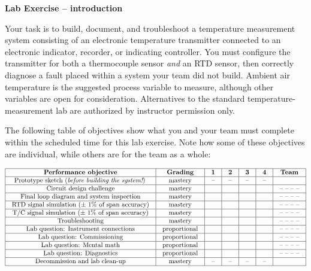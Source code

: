 

\noindent
{\bf Lab Exercise -- introduction}

\vskip 5pt

Your task is to build, document, and troubleshoot a temperature measurement system consisting of an electronic temperature transmitter connected to an electronic indicator, recorder, or indicating controller.  You must configure the transmitter for both a thermocouple sensor {\it and} an RTD sensor, then correctly diagnose a fault placed within a system your team did not build.  Ambient air temperature is the suggested process variable to measure, although other variables are open for consideration.  Alternatives to the standard temperature-measurement lab are authorized by instructor permission only.

The following table of objectives show what you and your team must complete within the scheduled time for this lab exercise.  Note how some of these objectives are individual, while others are for the team as a whole:



$$\vbox{\offinterlineskip
\halign{\strut
\vrule \quad\hfil # \ \hfil & 
\vrule \quad\hfil # \ \hfil & 
\vrule \quad\hfil # \ \hfil & 
\vrule \quad\hfil # \ \hfil & 
\vrule \quad\hfil # \ \hfil & 
\vrule \quad\hfil # \ \hfil & 
\vrule \quad\hfil # \ \hfil \vrule \cr
\noalign{\hrule}
%
{\bf Performance objective} & {\bf Grading} & {\bf 1} & {\bf 2} & {\bf 3} & {\bf 4} & {\bf Team} \cr
%
\noalign{\hrule}
%
Prototype sketch ({\it before building the system!}) & mastery & -- & -- & -- & -- & \cr
%
\noalign{\hrule}
%
Circuit design challenge & mastery & & & & & -- -- -- -- \cr
%
\noalign{\hrule}
%
Final loop diagram and system inspection & mastery & & & & & -- -- -- -- \cr
%
\noalign{\hrule}
%
RTD signal simulation ($\pm$ 1\% of span accuracy) & mastery & & & & & -- -- -- -- \cr
%
\noalign{\hrule}
%
T/C signal simulation ($\pm$ 1\% of span accuracy) & mastery & & & & & -- -- -- -- \cr
%
\noalign{\hrule}
%
Troubleshooting & mastery & & & & & -- -- -- -- \cr
%
\noalign{\hrule}
%
Lab question: Instrument connections & proportional &  &  &  &  & -- -- -- -- \cr
%
\noalign{\hrule}
%
Lab question: Commissioning & proportional &  &  &  &  & -- -- -- -- \cr
%
\noalign{\hrule}
%
Lab question: Mental math & proportional &  &  &  &  & -- -- -- -- \cr
%
\noalign{\hrule}
%
Lab question: Diagnostics & proportional &  &  &  &  & -- -- -- -- \cr
%
\noalign{\hrule}
%
Decommission and lab clean-up & mastery & -- & -- & -- & -- &  \cr
%
\noalign{\hrule}
} %
}$$ %


